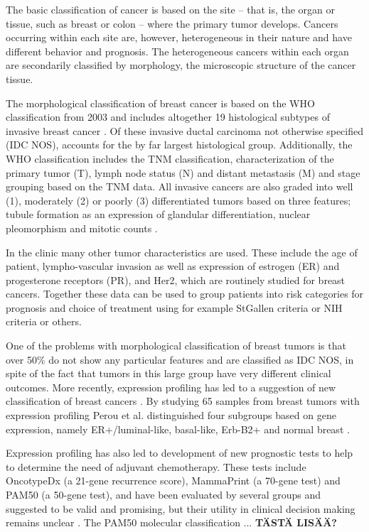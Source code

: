 The basic classification of cancer is based on the site -- that is, the organ
or tissue, such as breast or colon -- where the primary tumor develops.
Cancers occurring within each site are, however, heterogeneous in their nature
and have different behavior and prognosis. The heterogeneous cancers within
each organ are secondarily classified by morphology, the microscopic structure
of the cancer tissue.

The morphological classification of breast cancer is based on the WHO
classification from 2003 and includes altogether 19 histological subtypes of
invasive breast cancer \citep{Tavassoli2003,Weigelt2009}. Of these invasive
ductal carcinoma not otherwise specified (IDC NOS), accounts for the by far
largest histological group. Additionally, the WHO classification includes the
TNM classification, characterization of the primary tumor (T), lymph node
status (N) and distant metastasis (M) and stage grouping based on the TNM
data. All invasive cancers are also graded into well (1), moderately (2) or
poorly (3) differentiated tumors based on three features; tubule formation as
an expression of glandular differentiation, nuclear pleomorphism and mitotic
counts \citep{Tavassoli2003}.

In the clinic many other tumor characteristics are used. These
include the age of patient, lympho-vascular invasion as well as expression of
estrogen (ER) and progesterone receptors (PR), and Her2, which are routinely
studied for breast cancers. Together these data can be used to group patients
into risk categories for prognosis and choice of treatment using for example
StGallen criteria \citep{Goldhirsch2007} or NIH criteria \citep{Eifel2001} or others.

One of the problems with morphological classification of breast tumors is that
over 50\% do not show any particular features and are classified as IDC NOS,
in spite of the fact that tumors in this large group have very different
clinical outcomes. More recently, expression profiling has led to a suggestion
of new classification of breast cancers \citep{Perou2000,Sorlie2001}. By studying 65
samples from breast tumors with expression profiling Perou et al.
distinguished four subgroups based on gene expression, namely
ER+/luminal-like, basal-like, Erb-B2+ and normal breast \citep{Perou2000}.

Expression profiling has also led to development of new prognostic tests to
help to determine the need of adjuvant chemotherapy. These tests include
OncotypeDx (a 21-gene recurrence score), MammaPrint (a 70-gene test) and PAM50
(a 50-gene test), and have been evaluated by several groups and suggested to be
valid and promising, but their utility in clinical decision making remains
unclear \citep{Azim2013}. The PAM50 molecular classification ... \textbf{TÄSTÄ LISÄÄ?}






